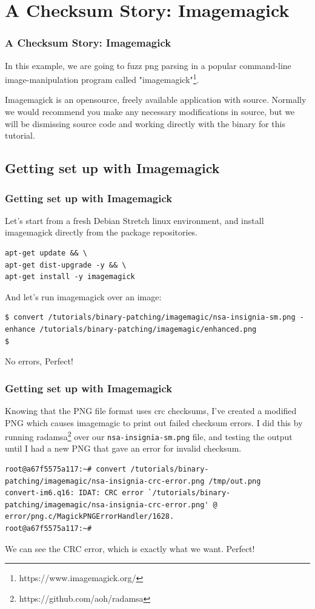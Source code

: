 \documentclass{beamer}
\begin{document}
\section{A Checksum Story: Imagemagick}

\begin{frame}
\frametitle{A Checksum Story: Imagemagick}
In this example, we are going to fuzz png parsing in a popular command-line
image-manipulation program called
"imagemagick"\footnote{https://www.imagemagick.org/}.
\par
Imagemagick is an opensource, freely available application with source. Normally
we would recommend you make any necessary modifications in source, but we will
be dismissing source code and working directly with the binary for this
tutorial.
\end{frame}


\subsection{Getting set up with Imagemagick}
\begin{frame}[fragile]
\frametitle{Getting set up with Imagemagick}
Let's start from a fresh Debian Stretch linux environment, and install
imagemagick directly from the package repositories.
  \begin{lstlisting}
apt-get update && \
apt-get dist-upgrade -y && \
apt-get install -y imagemagick
  \end{lstlisting}

And let's run imagemagick over an image:
  \begin{lstlisting}
$ convert /tutorials/binary-patching/imagemagic/nsa-insignia-sm.png -enhance /tutorials/binary-patching/imagemagic/enhanced.png
$
  \end{lstlisting}

No errors, Perfect!
\end{frame}


\begin{frame}[fragile]
\frametitle{Getting set up with Imagemagick}
Knowing that the PNG file format uses crc checksums, I've created a modified PNG
which causes imagemagic to print out failed checksum errors. I did this by
running radamsa\footnote{https://github.com/aoh/radamsa} over our
\texttt{nsa-insignia-sm.png} file, and testing the output until I had a new PNG
that gave an error for invalid checksum.
\par
  \begin{lstlisting}
root@a67f5575a117:~# convert /tutorials/binary-patching/imagemagic/nsa-insignia-crc-error.png /tmp/out.png
convert-im6.q16: IDAT: CRC error `/tutorials/binary-patching/imagemagic/nsa-insignia-crc-error.png' @ error/png.c/MagickPNGErrorHandler/1628.
root@a67f5575a117:~# 
  \end{lstlisting}

We can see the CRC error, which is exactly what we want. Perfect!
\end{frame}
\end{document}
